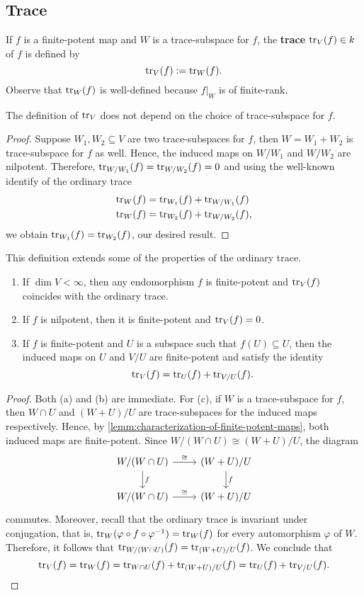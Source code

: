 \subsection{Trace}  If $f$ is a finite-potent map and $W$ is a trace-subspace for $f$, the \textbf{trace} $\operatorname{tr}_{V}(f)\in k$ of $f$ is defined by
\[
	\operatorname{tr}_{V}(f) := \operatorname{tr}_{W}(f).
\]
Observe that $\operatorname{tr}_{W}(f)$ is well-defined because $f\lvert_{W}$ is of finite-rank. 
\begin{proposition}\label{prop:trace-does-not-depend-on-W}
	The definition of $\operatorname{tr}_{V}$ does not depend on the choice of trace-subspace for $f$.
\end{proposition}
\begin{proof}
	Suppose $W_{1}, W_{2} \subseteq V$ are two trace-subspaces for $f$, then $W = W_{1} + W_{2}$ is trace-subspace for $f$ as well. Hence, the induced maps on $W/W_{1}$ and $W/W_{2}$ are nilpotent. Therefore, $\operatorname{tr}_{W/W_{1}}(f) = \operatorname{tr}_{W/W_{2}}(f) = 0$ and using the well-known identify of the ordinary trace
\begin{align*}
	\operatorname{tr}_{W}(f) &= \operatorname{tr}_{W_{1}}(f) + \operatorname{tr}_{W/W_{1}}(f) \\
	\operatorname{tr}_{W}(f) &= \operatorname{tr}_{W_{2}}(f) + \operatorname{tr}_{W/W_{2}}(f),
\end{align*}
we obtain $\operatorname{tr}_{W_{1}}(f) = \operatorname{tr}_{W_{2}}(f)$, our desired result. 
\end{proof}
This definition extends some of the properties of the ordinary trace.
\begin{lemma}\label{lemm:properties-trace}
	\begin{enumerate}[label = (\alph*)]
		\item If $\dim V < \infty$, then any endomorphism $f$ is finite-potent and $\operatorname{tr}_{V}(f)$ coincides with the ordinary trace.
		\item If $f$ is nilpotent, then it is finite-potent and $\operatorname{tr}_{V}(f) = 0$.
		\item If $f$ is finite-potent and $U$ is a subspace such that $f(U) \subseteq U$, then the induced maps on $U$ and $V/U$ are finite-potent and satisfy the identity
		\[
		 	\operatorname{tr}_{V}(f) = \operatorname{tr}_{U}(f) + \operatorname{tr}_{V/U}(f).
		 \] 
	\end{enumerate}
\end{lemma}
\begin{proof}
	Both (a) and (b) are immediate. For (c), if $W$ is a trace-subspace for $f$, then $W\cap U$ and $(W + U)/U$ are trace-subspaces for the induced maps respectively. Hence, by \cref{lemm:characterization-of-finite-potent-maps}, both induced maps are finite-potent. Since $W/(W\cap U) \cong (W+U)/U$, the diagram
	\[
		\begin{tikzcd}
			W/(W\cap U) \arrow[r, "\cong"] \arrow[d, "f"] & (W+U)/U \arrow[d, "f"] \\
			W/(W\cap U) \arrow[r, "\cong"] & (W+U)/U
		\end{tikzcd}
	\]
	commutes. Moreover, recall that the ordinary trace is invariant under conjugation, that is, $\operatorname{tr}_{W}(\varphi \circ f \circ \varphi^{-1}) = \operatorname{tr}_{W}(f)$ for every automorphism $\varphi$ of $W$. Therefore, it follows that $\operatorname{tr}_{W/(W\cap U)}(f) = \operatorname{tr}_{(W+U)/U}(f)$. We conclude that
	\[
	 	\operatorname{tr}_{V}(f) = \operatorname{tr}_{W}(f) = \operatorname{tr}_{W\cap U}(f) + \operatorname{tr}_{(W+U)/U}(f) = \operatorname{tr}_{U}(f) + \operatorname{tr}_{V/U}(f).
	\]
\end{proof}
